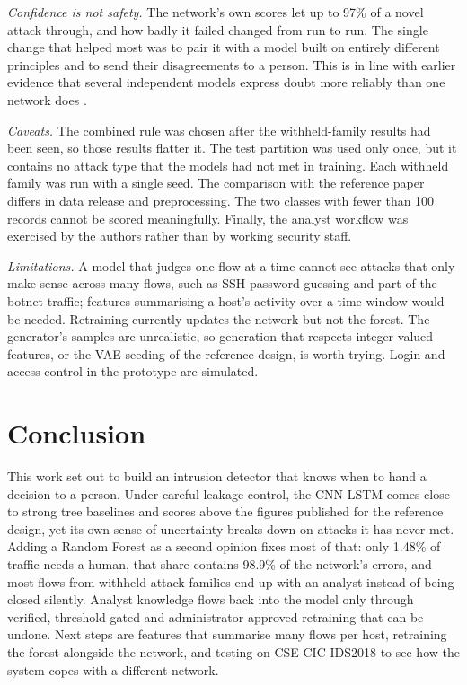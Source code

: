 \documentclass[conference]{IEEEtran}
\begin{document}
\textit{Confidence is not safety.} The network's own scores let up to 97\% of a novel attack
through, and how badly it failed changed from run to run. The single change that helped most was
to pair it with a model built on entirely different principles and to send their disagreements to
a person. This is in line with earlier evidence that several independent models express doubt
more reliably than one network does \cite{lakshminarayanan2017simple}.

\textit{Caveats.} The combined rule was chosen after the withheld-family results had been seen, so
those results flatter it. The test partition was used only once, but it contains no attack type
that the models had not met in training. Each withheld family was run with a single seed. The
comparison with the reference paper differs in data release and preprocessing. The two classes
with fewer than 100 records cannot be scored meaningfully. Finally, the analyst workflow was
exercised by the authors rather than by working security staff.

\textit{Limitations.} A model that judges one flow at a time cannot see attacks that only make
sense across many flows, such as SSH password guessing and part of the botnet traffic; features
summarising a host's activity over a time window would be needed. Retraining currently updates
the network but not the forest. The generator's samples are unrealistic, so generation that
respects integer-valued features, or the VAE seeding of the reference design, is worth trying.
Login and access control in the prototype are simulated.

\section{Conclusion}
This work set out to build an intrusion detector that knows when to hand a decision to a person.
Under careful leakage control, the CNN-LSTM comes close to strong tree baselines and scores above
the figures published for the reference design, yet its own sense of uncertainty breaks down on
attacks it has never met. Adding a Random Forest as a second opinion fixes most of that: only
1.48\% of traffic needs a human, that share contains 98.9\% of the network's errors, and most
flows from withheld attack families end up with an analyst instead of being closed silently.
Analyst knowledge flows back into the model only through verified, threshold-gated and
administrator-approved retraining that can be undone. Next steps are features that summarise many
flows per host, retraining the forest alongside the network, and testing on CSE-CIC-IDS2018 to see
how the system copes with a different network.
\end{document}
